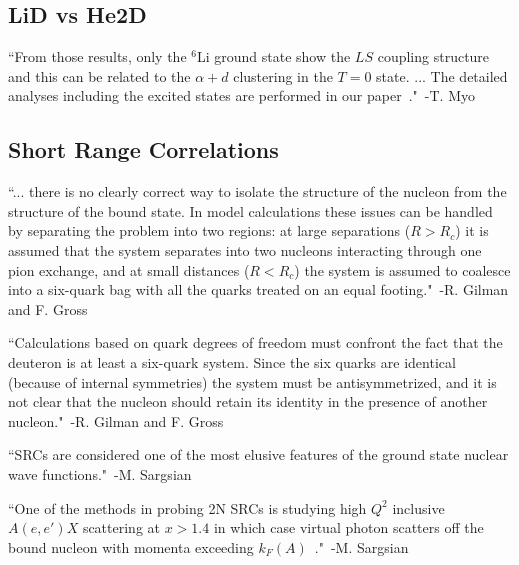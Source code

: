 \subsection{LiD vs He2D}

``From those results, only the $^6$Li ground state show the $LS$ coupling structure and this can be related to the $\alpha + d$ clustering in the $T=0$ state. ... The detailed analyses including the excited states are performed in our paper~\cite{Myo:2012pv}."~-T. Myo~\cite{Myo:2013dya}

\subsection{Short Range Correlations}

``... there is no clearly correct way to isolate the structure of the nucleon from the structure of the bound state. In model calculations these issues can be handled by separating the problem into two regions: at large separations ($R>R_c$) it is assumed that the system separates into two nucleons interacting through one pion exchange, and at small distances ($R<R_c$) the system is assumed to coalesce into a six-quark bag with all the quarks treated on an equal footing."~-R. Gilman and F. Gross~\cite{Gilman:2001yh}


``Calculations based on quark degrees of freedom must confront the fact that the deuteron is at least a six-quark system. Since the six quarks are identical (because of internal symmetries) the system must be antisymmetrized, and it is not clear that the nucleon should retain its identity in the presence of another nucleon."~-R. Gilman and F. Gross~\cite{Gilman:2001yh}


``SRCs are considered one of the most elusive features of the ground state nuclear wave functions."~-M. Sargsian~\cite{Sargsian:2012gj}

``One of the methods in probing 2N SRCs is studying high $Q^2$ inclusive $A(e,e')X$ scattering at $x>1.4$ in which case virtual photon scatters off the bound nucleon with momenta exceeding $k_F(A)$~\cite{Sargsian:2001ax, Sargsian:2002wc}."~-M. Sargsian~\cite{Sargsian:2012gj}


